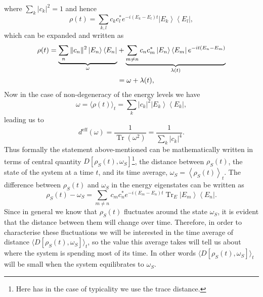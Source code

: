 where $\sum_{k}\left|c_{k}\right|^{2}=1$ and hence
\begin{equation}
\rho(t)=\sum_{k, l} c_{k} c_{l}^{*} e^{-i\left(E_{k}-E_{l}\right) t}\left|E_{k}\right\rangle\left\langle E_{l}\right|,
\label{CH1:expansion_2}
\end{equation}
which can be expanded and written as
\begin{equation}
\begin{aligned}
\rho(t)=\underbrace{\sum_{n}\|c_{n}\|^{2}\mathinner{|{E_{n}}\rangle}\mathinner{\langle{E_{n}}|}}_{\omega}&+\underbrace{\sum_{m \neq n} c_{n} c_{m}^{*}\mathinner{|{E_{n}}\rangle}\mathinner{\langle{E_{m}}|} e^{-i t\left(E_{n}-E_{m}\right)}}_{\lambda (t)} \\
&=\omega+\lambda(t),
\end{aligned}
\label{CH1:Expansion_to_use_after}
\end{equation}
Now in the case of non-degeneracy of the energy levels we have
\begin{equation}
\omega=\langle\rho(t)\rangle_{t}=\sum_{k}\left|c_{k}\right|^{2}\left|E_{k}\right\rangle\left\langle E_{k}\right|,
\label{CH1:expansion_3}
\end{equation}
leading us to 
\begin{equation}
d^{\mathrm{eff}}(\omega)=\frac{1}{\operatorname{Tr}\left(\omega^{2}\right)}=\frac{1}{\sum_{k}\left|c_{k}\right|^{4}}.
\label{CH1:expansion_4}
\end{equation}
Thus formally the statement above-mentioned can be mathematically written in terms of central quantity $D\left[\rho_{S}(t), \omega_{S}\right]$\footnote{Here has in the case of typicality we use the trace distance.}, the distance between $\rho_S(t)$, the state of the system at a time $t$, and its time average, $\omega_{S}=\left\langle\rho_{S}(t)\right\rangle_{t}$. The difference between $\rho_S(t)$ and $\omega_{S}$ in the energy eigenstates can be written as
\begin{equation}
\rho_{S}(t)-\omega_{S}=\sum_{m \neq n} c_{m} c_{n}^{*} e^{-i\left(E_{m}-E_{n}\right) t} \operatorname{Tr}_{E}\left|E_{m}\right\rangle\left\langle E_{n}\right|.
\label{CH1:expansion_5}
\end{equation}
Since in general we know that $\rho_S(t)$ fluctuates around the state $\omega_S$, it is evident that the distance between them will change over time. Therefore, in order to characterise these fluctuations we will be interested in the time average of distance $\langle D\left[\rho_{S}(t), \omega_{S}\right]\rangle_t$, so the value this average takes will tell us about where the system is spending most of its time. In other words $\langle D\left[\rho_{S}(t), \omega_{S}\right]\rangle_t$ will be small when the system equilibrates to $\omega_S$.\newline
